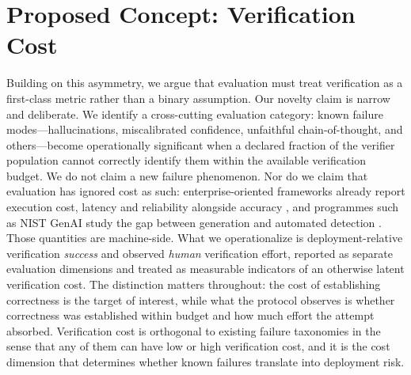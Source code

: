 \documentclass[11pt]{article}
\newcommand{\viola}[1]{\textcolor[HTML]{7030A0}{#1}}
\newcommand{\viola}[1]{#1}
\begin{document}
\section{Proposed Concept: Verification Cost}
\label{sec:concept}
Building on this asymmetry, we argue that evaluation must treat verification as a first-class metric rather than a binary assumption. {Our novelty claim is narrow and deliberate. We identify a cross-cutting evaluation category: known failure modes---hallucinations, miscalibrated confidence, unfaithful chain-of-thought, and others---\viola{become operationally significant when a declared fraction of the verifier population cannot correctly identify them within the available verification budget}. We do not claim a new failure phenomenon. \viola{Nor do we claim that evaluation has ignored cost as such: enterprise-oriented frameworks already report execution cost, latency and reliability alongside accuracy \citep{mehta2025clear}, and programmes such as NIST GenAI study the gap between generation and automated detection \citep{nist2024genai}. Those quantities are machine-side. \viola{What we operationalize is deployment-relative verification \emph{success} and observed \emph{human} verification effort, reported as separate evaluation dimensions and treated as measurable indicators of an otherwise latent verification cost. The distinction matters throughout: the cost of establishing correctness is the target of interest, while what the protocol observes is whether correctness was established within budget and how much effort the attempt absorbed.}} Verification cost is orthogonal to existing failure taxonomies in the sense that any of them can have low or high verification cost, and it is the cost dimension that determines whether known failures translate into deployment risk.}
\end{document}
